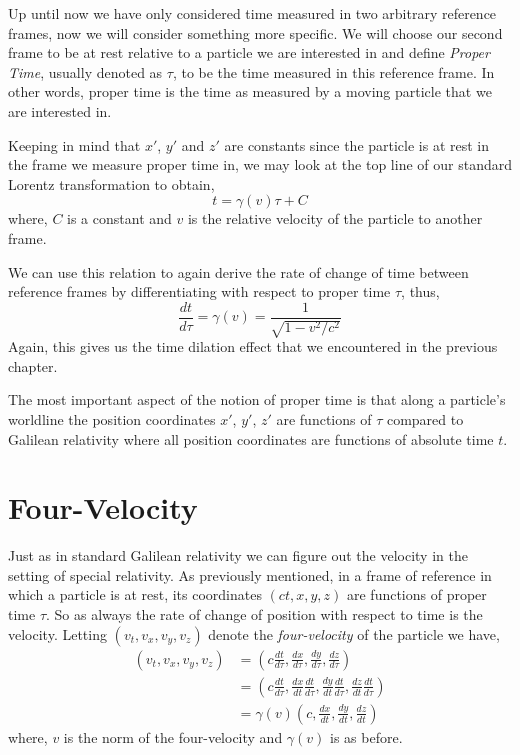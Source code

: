 \documentclass[a4paper,12pt,draft]{report}
\begin{document}
Up until now we have only considered time measured in two arbitrary reference frames, now we will consider something more specific. We will choose our second frame to be at rest relative to a particle we are interested in and define \emph{Proper Time}, usually denoted as $\tau$, to be the time measured in this reference frame. In other words, proper time is the time as measured by a moving particle that we are interested in.

Keeping in mind that $x'$, $y'$ and $z'$ are constants since the particle is at rest in the frame we measure proper time in, we may look at the top line of our standard Lorentz transformation to obtain,
$$
t = \gamma(v)\tau + C
$$
where, $C$ is a constant and $v$ is the relative velocity of the particle to another frame.

We can use this relation to again derive the rate of change of time between reference frames by differentiating with respect to proper time $\tau$, thus,
$$
\frac{dt}{d\tau} = \gamma(v) = \frac{1}{\sqrt{1 - v^2/c^2}}
$$
Again, this gives us the time dilation effect that we encountered in the previous chapter.

The most important aspect of the notion of proper time is that along a particle's worldline the position coordinates $x'$, $y'$, $z'$ are functions of $\tau$ compared to Galilean relativity where all position coordinates are functions of absolute time $t$.

\section{Four-Velocity}

Just as in standard Galilean relativity we can figure out the velocity in the setting of special relativity. As previously mentioned, in a frame of reference in which a particle is at rest, its coordinates $(ct, x, y, z)$ are functions of proper time $\tau$. So as always the rate of change of position with respect to time is the velocity. Letting $(v_t, v_x, v_y, v_z)$ denote the \emph{four-velocity} of the particle we have,
$$
\begin{aligned}
(v_t, v_x, v_y, v_z) & = \left(c\frac{dt}{d\tau}, \frac{dx}{d\tau}, \frac{dy}{d\tau}, \frac{dz}{d\tau}\right)\\
& = \left(c\frac{dt}{d\tau}, \frac{dx}{dt}\frac{dt}{d\tau}, \frac{dy}{dt}\frac{dt}{d\tau}, \frac{dz}{dt}\frac{dt}{d\tau}\right)\\
& = \gamma(v)\left(c, \frac{dx}{dt}, \frac{dy}{dt}, \frac{dz}{dt}\right)
\end{aligned}
$$
where, $v$ is the norm of the four-velocity and $\gamma(v)$ is as before.
\end{document}
